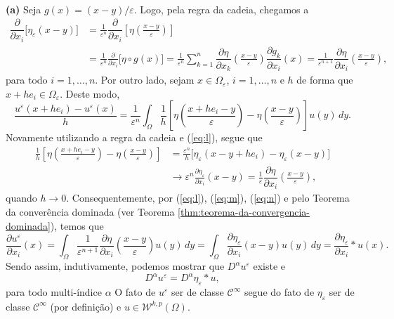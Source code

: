 \documentclass[a4paper, 11pt]{book}
\theoremstyle{definition}
\newcommand{\cC}{\mathcal{C}}
\newcommand{\cW}{\mathcal{W}}
\begin{document}
\begin{prf}
    ~

    \textbf{(a)} Seja $g(x) = (x-y)/\varepsilon $. Logo, pela regra da cadeia, chegamos a
    \begin{equation} \label{eq:l}
        \begin{aligned}
            \dfrac{\partial}{\partial x_i} \big[\eta_\varepsilon(x-y)\big] &= \frac{1}{\varepsilon^n}\dfrac{\partial }{\partial x_i}\left[\eta\left( \frac{x - y}{\varepsilon} \right) \right] \\
            &=\frac{1}{\varepsilon^n} \frac{\partial}{\partial x_i} \big[ \eta \circ g(x) \big]
            = \frac{1}{\varepsilon^n} \sum_{k =1}^n \dfrac{\partial \eta}{\partial x_k}\left( \frac{x - y}{\varepsilon} \right) \dfrac{\partial g_k}{\partial x_i}(x) = \frac{1}{\varepsilon^{n+1}} \dfrac{\partial \eta}{\partial x_i}\left( \frac{x - y}{\varepsilon} \right),
        \end{aligned}
    \end{equation}
    para todo $i = 1,\dots,n$. Por outro lado, sejam $x \in \Omega_\varepsilon$, $i = 1,\dots,n$ e $h$ de forma que $x + he_i \in \Omega_\varepsilon$. Deste modo,
    \begin{equation} \label{eq:m}
        \frac{u^\varepsilon(x + he_i) - u^\varepsilon(x)}{h} 
            = \frac{1}{\varepsilon^n} \int_\Omega \frac{1}{h}\left[  \eta\left( \frac{x + he_i - y}{\varepsilon} \right) - \eta\left( \frac{x -y}{\varepsilon} \right) \right] u(y) \,dy.
    \end{equation} 
    Novamente utilizando a regra da cadeia e (\ref{eq:l}), segue que
    \begin{equation} \label{eq:n}
        \begin{aligned}
            \frac{1}{h}\left[  \eta\left( \frac{x + he_i - y}{\varepsilon} \right) - \eta\left( \frac{x -y}{\varepsilon} \right) \right] &=
            \frac{\varepsilon^n}{h} \bigg[ \eta_\varepsilon (x-y + he_i) - \eta_\varepsilon(x-y) \bigg]\\
            &\to
            \varepsilon^n \frac{\partial\eta_\varepsilon}{\partial x_i} (x-y) =
            \frac{1}{\varepsilon}\dfrac{\partial \eta}{\partial x_i}\left( \frac{x - y}{\varepsilon} \right),
        \end{aligned}
    \end{equation}
    quando $h \to 0$. Consequentemente, por (\ref{eq:l}), (\ref{eq:m}), (\ref{eq:n}) e pelo Teorema da converência dominada (ver Teorema \ref{thm:teorema-da-convergencia-dominada}), temos que
    \[
        \dfrac{\partial u^\varepsilon}{\partial x_i}(x) = \int_\Omega \frac{1}{\varepsilon^{n+1}} \dfrac{\partial \eta}{\partial x_i}\left( \frac{x - y}{\varepsilon} \right) u(y) \,dy = \int_\Omega \dfrac{\partial \eta_\varepsilon}{\partial x_i} (x-y) u(y) \,dy = \frac{\partial \eta_\varepsilon}{\partial x_i} * u(x).
    \]
    Sendo assim,
    indutivamente, podemos mostrar que $D^\alpha u^\varepsilon$ existe e
    \[
        D^\alpha u^\varepsilon = D^\alpha\eta_\varepsilon * u,
    \]
    para todo multi-índice $\alpha$
    O fato de $u^\varepsilon$ ser de classe $\cC^\infty$ segue do fato de $\eta_\varepsilon$ ser de classe $\cC^\infty$ (por definição) e $u \in \cW^{k,p}(\Omega)$.


\end{prf}
\end{document}
